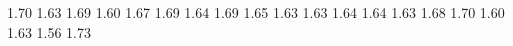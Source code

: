 1.70 1.63
1.69 1.60
1.67 1.69
1.64 1.69
1.65 1.63
1.63 1.64
1.64 1.63
1.68 1.70
1.60 1.63
1.56 1.73

